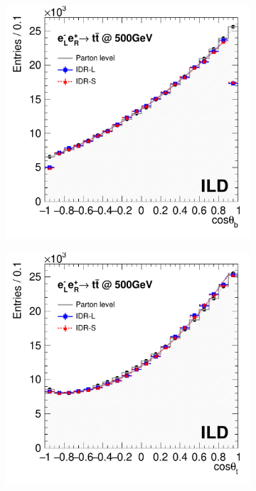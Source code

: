 \begin{figure}[htbp]
\begin{subfigure}{0.475\hsize} 
\includegraphics[width=\textwidth]{Performance/fig/compare_normalized_b.pdf}
 \caption{ \label{fig:ttbar:costhetab}}
 \end{subfigure}
\begin{subfigure}{0.475\hsize} 
\includegraphics[width=\textwidth]{Performance/fig/compare_normalized.pdf}

\end{subfigure}
\end{figure}
